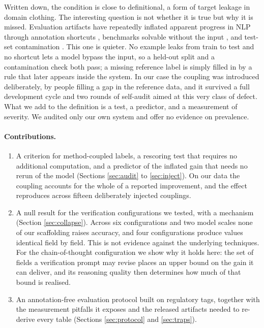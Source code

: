 \documentclass[11pt]{article}
\begin{document}
Written down, the condition is close to definitional, a form of target leakage in domain
clothing. The interesting question is not whether it is true but why it is missed.
Evaluation
artifacts have repeatedly inflated apparent progress in NLP through annotation shortcuts
\citep{gururangan2018annotation,poliak2018hypothesis}, benchmarks solvable without the
input \citep{kaushik2018much}, and test-set contamination
\citep{sainz2023nlp,recht2019imagenet}. This one is quieter. No example leaks from train to
test and no shortcut lets a model bypass the input, so a held-out split and a
contamination check both pass; a missing reference label is simply filled in by a rule
that later appears inside the system. In our case the coupling was
introduced deliberately, by people filling a gap in the reference data, and it survived a
full development cycle and two rounds of self-audit aimed at this very class of defect.
What we add to the definition is a test, a predictor, and a measurement of severity. We
audited only our own system and offer no evidence on prevalence.

\paragraph{Contributions.}
\begin{enumerate}[leftmargin=*, itemsep=2pt, topsep=2pt]
\item A criterion for method-coupled labels, a rescoring test that requires no additional
      computation, and a predictor of the inflated gain that needs no rerun of the model
      (Sections \ref{sec:audit} to \ref{sec:inject}). On our data the coupling accounts
      for the whole of a reported improvement, and the effect reproduces across fifteen
      deliberately injected couplings.
\item A null result for the verification configurations we tested, with a mechanism
      (Section \ref{sec:collapse}). Across six configurations and two model scales none
      of our scaffolding raises accuracy, and four configurations produce values
      identical field by field. This is not evidence against the underlying techniques.
      For the chain-of-thought configuration we show why it holds here: the set of fields
      a verification prompt may revise places an upper bound on the gain it can deliver,
      and its reasoning quality then determines how much of that bound is realised.
\item An annotation-free evaluation protocol built on regulatory tags, together with the
      measurement pitfalls it exposes and the released artifacts needed to re-derive
      every table (Sections \ref{sec:protocol} and \ref{sec:traps}).
\end{enumerate}
\end{document}
